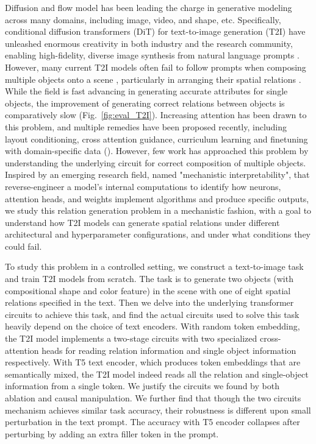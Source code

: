Diffusion and flow model \citep{dickstein2015noneq,Dhariwal2021Diffusion,ho2020DDPM,Lipman2023Flow,Albergo2023Stochastic} has been leading the charge in generative modeling across many domains, including image, video, and shape\cite{Ho2022video}, etc.
Specifically, conditional diffusion transformers (DiT) for text-to-image generation (T2I) have unleashed enormous creativity in both industry and the research community, enabling high-fidelity, diverse image synthesis from natural language prompts \cite{rombach2022latentdiff}.
However, many current T2I models often fail to follow prompts when composing multiple objects onto a scene \citep{Conwell2022Testing}, particularly in arranging their spatial relations \citep{huang2023t2icompbench,ghosh2023genevalobjectfocusedframeworkevaluating,huang2025t2icompbench++}. While the field is fast advancing in generating accurate attributes for single objects, the improvement of generating correct relations between objects is comparatively slow (Fig.~\ref{fig:eval_T2I}).
Increasing attention has been drawn to this problem, and multiple remedies have been proposed recently, including layout conditioning, cross attention guidance, curriculum learning and finetuning with domain-specific data (\cite{li2023gligenopensetgroundedtexttoimage,
chefer2023attendandexciteattentionbasedsemanticguidance,
chatterjee2024gettingrightimprovingspatial,
han2025progressive}).
However, few work has approached this problem by understanding the underlying circuit for correct composition of multiple objects.
Inspired by an emerging research field, named "mechanistic interpretability", that reverse-engineer a model's internal computations to identify how neurons, attention heads, and weights implement algorithms and produce specific outputs, we study this relation generation problem in a mechanistic fashion, with a goal to understand how T2I models can generate spatial relations under different architectural and hyperparameter configurations, and under what conditions they could fail.

To study this problem in a controlled setting, we construct a text-to-image task and train T2I models from scratch. The task is to generate two objects (with compositional shape and color feature) in the scene with one of eight spatial relations specified in the text. Then we delve into the underlying transformer circuits to achieve this task, and find the actual circuits used to solve this task heavily depend on the choice of text encoders. With random token embedding, the T2I model implements a two-stage circuits with two specialized cross-attention heads for reading relation information and single object information respectively. With T5 text encoder, which produces token embeddings that are semantically mixed, the T2I model indeed reads all the relation and single-object information from a single token. We justify the circuits we found by both ablation and causal manipulation. We further find that though the two circuits mechanism achieves similar task accuracy, their robustness is different upon small perturbation in the text prompt. The accuracy with T5 encoder collapses after perturbing by adding an extra filler token in the prompt.

